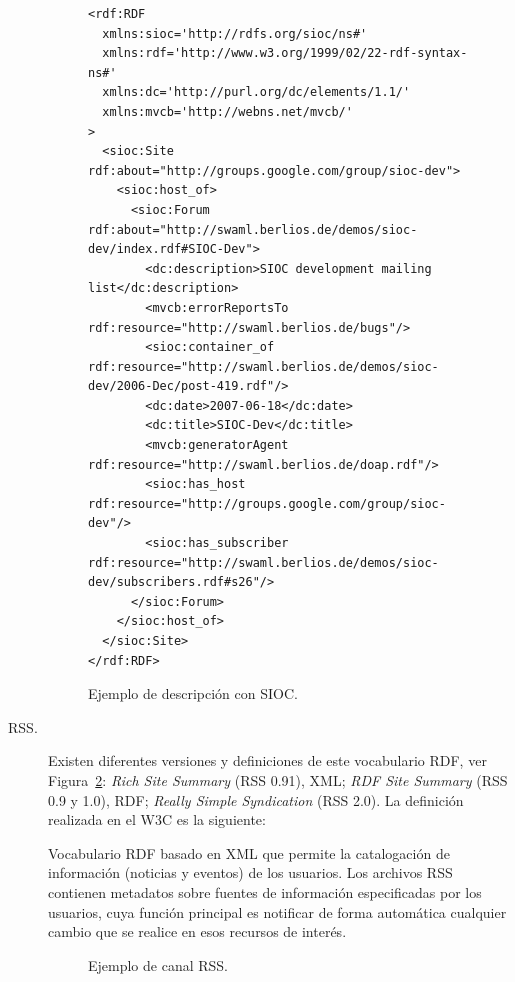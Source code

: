 \begin{description}
\begin{figure}[!htbp]
\centering
  \begin{lstlisting}
<rdf:RDF
  xmlns:sioc='http://rdfs.org/sioc/ns#'
  xmlns:rdf='http://www.w3.org/1999/02/22-rdf-syntax-ns#'
  xmlns:dc='http://purl.org/dc/elements/1.1/'
  xmlns:mvcb='http://webns.net/mvcb/'
>
  <sioc:Site rdf:about="http://groups.google.com/group/sioc-dev">
    <sioc:host_of>
      <sioc:Forum rdf:about="http://swaml.berlios.de/demos/sioc-dev/index.rdf#SIOC-Dev">
        <dc:description>SIOC development mailing list</dc:description>
        <mvcb:errorReportsTo rdf:resource="http://swaml.berlios.de/bugs"/>
        <sioc:container_of rdf:resource="http://swaml.berlios.de/demos/sioc-dev/2006-Dec/post-419.rdf"/>
        <dc:date>2007-06-18</dc:date>
        <dc:title>SIOC-Dev</dc:title>
        <mvcb:generatorAgent rdf:resource="http://swaml.berlios.de/doap.rdf"/>
        <sioc:has_host rdf:resource="http://groups.google.com/group/sioc-dev"/>
        <sioc:has_subscriber rdf:resource="http://swaml.berlios.de/demos/sioc-dev/subscribers.rdf#s26"/>
      </sioc:Forum>
    </sioc:host_of>
  </sioc:Site>
</rdf:RDF>
  \end{lstlisting}
\caption{Ejemplo de descripción con SIOC.}
\label{fig:sioc-example}
\end{figure}

\item[\gls{RSS}.] Existen diferentes versiones y definiciones de este vocabulario RDF, ver Figura~\ref{fig:rss-example}: \textit{Rich Site Summary} (RSS 0.91), XML; 
\textit{RDF Site Summary} (RSS 0.9 y 1.0), RDF; \textit{Really Simple Syndication} (RSS 2.0). La definición
realizada en el \gls{W3C} es la siguiente:

\begin{Frame}
Vocabulario RDF basado en XML que permite la catalogación de información (noticias y eventos) 
de los usuarios. Los archivos RSS contienen metadatos sobre fuentes de información especificadas 
por los usuarios, cuya función principal es notificar de forma automática cualquier cambio que se realice 
en esos recursos de interés.
\end{Frame}

\begin{figure}[!htb]
\centering

\label{fig:rss-example}
\caption{Ejemplo de canal RSS.}
\end{figure}

\end{description}

